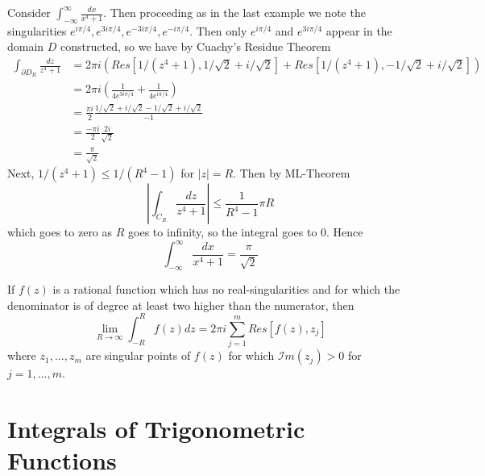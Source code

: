 \begin{example}
    Consider $\int_{-\infty}^{\infty}\frac{dx}{x^4+1}$. Then proceeding as in the last example we note the singularities $e^{i\pi/4},e^{3i\pi/4},e^{-3i\pi/4},e^{-i\pi/4}$. Then only $e^{i\pi/4}$ and $e^{3i\pi/4}$ appear in the domain $D$ constructed, so we have by Cuachy's Residue Theorem \begin{align*}
        \int_{\partial D_R}\frac{dz}{z^4+1} &= 2\pi i(Res[1/(z^4+1),1/\sqrt{2}+i/\sqrt{2}]+Res[1/(z^4+1),-1/\sqrt{2}+i/\sqrt{2}]) \\
        &= 2\pi i\left(\frac{1}{4e^{3i\pi/4}}+\frac{1}{4e^{i\pi/4}}\right) \\
        &= \frac{\pi i}{2}\frac{1/\sqrt{2}+i/\sqrt{2}-1/\sqrt{2}+i/\sqrt{2}}{-1} \\
        &= \frac{-\pi i}{2}\frac{2i}{\sqrt{2}} \\
        &= \frac{\pi}{\sqrt{2}}
    \end{align*}
    Next, $1/(z^4+1) \leq 1/(R^4-1)$ for $|z| = R$. Then by ML-Theorem \begin{equation*}
        \left|\int_{C_R}\frac{dz}{z^4+1}\right| \leq \frac{1}{R^4-1}\pi R
    \end{equation*}
    which goes to zero as $R$ goes to infinity, so the integral goes to $0$. Hence \begin{equation*}
        \int_{-\infty}^{\infty}\frac{dx}{x^4+1} = \frac{\pi}{\sqrt{2}}
    \end{equation*}
\end{example}

\begin{proposition}
    If $f(z)$ is a rational function which has no real-singularities and for which the denominator is of degree at least two higher than the numerator, then \begin{equation*}
        \lim\limits_{R\rightarrow \infty}\int_{-R}^Rf(z)dz = 2\pi i \sum_{j=1}^mRes[f(z),z_j]
    \end{equation*}
    where $z_1,...,z_m$ are singular points of $f(z)$ for which $\mathscr{I}m(z_j) > 0$ for $j = 1,...,m$.
\end{proposition}





\section{Integrals of Trigonometric Functions}

